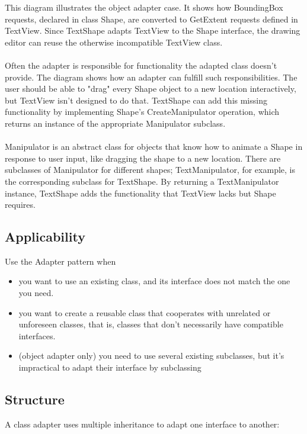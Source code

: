 This diagram illustrates the object adapter case. It shows how BoundingBox requests, declared in class Shape, are converted to GetExtent requests defined in TextView. Since TextShape adapts TextView to the Shape interface, the drawing editor can reuse the otherwise incompatible TextView class.
\\\\
Often the adapter is responsible for functionality the adapted class doesn't provide. The diagram shows how an adapter can fulfill such responsibilities. The user should be able to "drag" every Shape object to a new location interactively, but TextView isn't designed to do that. TextShape can add this missing functionality by implementing Shape's CreateManipulator operation, which returns an instance of the appropriate Manipulator subclass.
\\\\
Manipulator is an abstract class for objects that know how to animate a Shape in response to user input, like dragging the shape to a new location. There are subclasses of Manipulator for different shapes; TextManipulator, for example, is the corresponding subclass for TextShape. By returning a TextManipulator instance, TextShape adds the functionality that TextView lacks but Shape requires.

\subsection*{Applicability}

Use the Adapter pattern when
\begin{itemize}
    \item you want to use an existing class, and its interface does not match the one you need.
    \item you want to create a reusable class that cooperates with unrelated or unforeseen classes, that is, classes that don't necessarily have compatible interfaces.
    \item (object adapter only) you need to use several existing subclasses, but it's impractical to adapt their interface by subclassing
\end{itemize}

\subsection*{Structure}

A class adapter uses multiple inheritance to adapt one interface to another:

